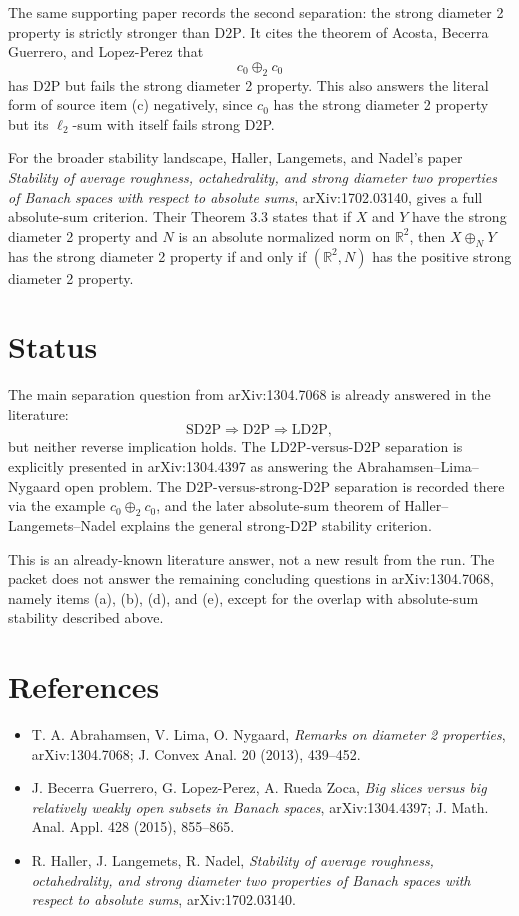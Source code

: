 \documentclass[11pt]{article}
\newcommand{\LDTP}{\mathrm{LD2P}}
\newcommand{\DTP}{\mathrm{D2P}}
\newcommand{\SDTP}{\mathrm{SD2P}}
\newcommand{\cnull}{c_0}
\begin{document}
The same supporting paper records the second separation: the strong diameter
2 property is strictly stronger than \(\DTP\). It cites the theorem of
Acosta, Becerra Guerrero, and Lopez-Perez that
\[
  \cnull \oplus_2 \cnull
\]
has \(\DTP\) but fails the strong diameter 2 property. This also answers the
literal form of source item (c) negatively, since \(\cnull\) has the strong
diameter 2 property but its \(\ell_2\)-sum with itself fails strong D2P.

For the broader stability landscape, Haller, Langemets, and Nadel's paper
\emph{Stability of average roughness, octahedrality, and strong diameter two
properties of Banach spaces with respect to absolute sums}, arXiv:1702.03140,
gives a full absolute-sum criterion. Their Theorem 3.3 states that if \(X\)
and \(Y\) have the strong diameter 2 property and \(N\) is an absolute
normalized norm on \(\mathbb R^2\), then \(X\oplus_N Y\) has the strong
diameter 2 property if and only if \((\mathbb R^2,N)\) has the positive strong
diameter 2 property.

\section*{Status}

The main separation question from arXiv:1304.7068 is already answered in the
literature:
\[
  \SDTP \Longrightarrow \DTP \Longrightarrow \LDTP,
\]
but neither reverse implication holds. The \(\LDTP\)-versus-\(\DTP\)
separation is explicitly presented in arXiv:1304.4397 as answering the
Abrahamsen--Lima--Nygaard open problem. The \(\DTP\)-versus-strong-D2P
separation is recorded there via the example \(\cnull\oplus_2\cnull\), and
the later absolute-sum theorem of Haller--Langemets--Nadel explains the
general strong-D2P stability criterion.

This is an already-known literature answer, not a new result from the run.
The packet does not answer the remaining concluding questions in
arXiv:1304.7068, namely items (a), (b), (d), and (e), except for the overlap
with absolute-sum stability described above.

\section*{References}

\sloppy
\begin{itemize}
\item T. A. Abrahamsen, V. Lima, O. Nygaard, \emph{Remarks on diameter 2
properties}, arXiv:1304.7068; J. Convex Anal. 20 (2013), 439--452.
\item J. Becerra Guerrero, G. Lopez-Perez, A. Rueda Zoca, \emph{Big slices
versus big relatively weakly open subsets in Banach spaces}, arXiv:1304.4397;
J. Math. Anal. Appl. 428 (2015), 855--865.
\item R. Haller, J. Langemets, R. Nadel, \emph{Stability of average roughness,
octahedrality, and strong diameter two properties of Banach spaces with
respect to absolute sums}, arXiv:1702.03140.
\end{itemize}
\end{document}
